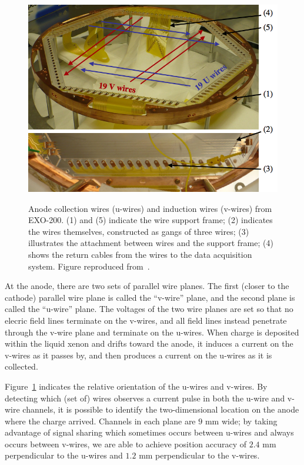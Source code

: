 \begin{figure}
\begin{center}
\includegraphics[keepaspectratio=true,width=\textwidth]{supportwithoutwires.png}
\end{center}
\renewcommand{\baselinestretch}{1}
\small\normalsize
\begin{quote}
\caption{Anode collection wires (u-wires) and induction wires (v-wires) from EXO-200.  (1) and (5) indicate the wire support frame; (2) indicates the wires themselves, constructed as gangs of three wires; (3) illustrates the attachment between wires and the support frame; (4) shows the return cables from the wires to the data acquisition system.  Figure reproduced from~\cite{detectorPartI}.}
\label{fig:UandVWiresCrossing}
\end{quote}
\end{figure}
\renewcommand{\baselinestretch}{2}
\small\normalsize

At the anode, there are two sets of parallel wire planes.  The first (closer to the cathode) parallel wire plane is called the ``v-wire'' plane, and the second plane is called the ``u-wire'' plane.  The voltages of the two wire planes are set so that no elecric field lines terminate on the v-wires, and all field lines instead penetrate through the v-wire plane and terminate on the u-wires.  When charge is deposited within the liquid xenon and drifts toward the anode, it induces a current on the v-wires as it passes by, and then produces a current on the u-wires as it is collected.

Figure~\ref{fig:UandVWiresCrossing} indicates the relative orientation of the u-wires and v-wires.  By detecting which (set of) wires observes a current pulse in both the u-wire and v-wire channels, it is possible to identify the two-dimensional location on the anode where the charge arrived.  Channels in each plane are $9$ mm wide; by taking advantage of signal sharing which sometimes occurs between u-wires and always occurs between v-wires, we are able to achieve position accuracy of $2.4$ mm perpendicular to the u-wires and $1.2$ mm perpendicular to the v-wires.~\cite{bb2nEXO2014}

